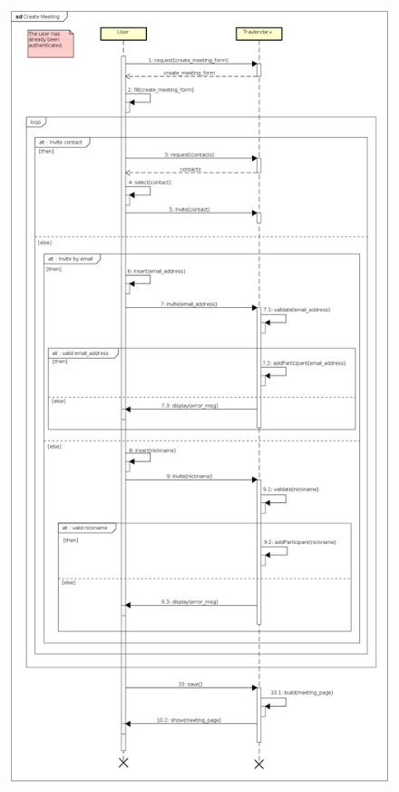 \begin{figure}[H]
	\centering\includegraphics[height=\textheight]{Images/SequenceDiagrams/User/CreateMeeting.png}{}
	\caption{}
\end{figure}

